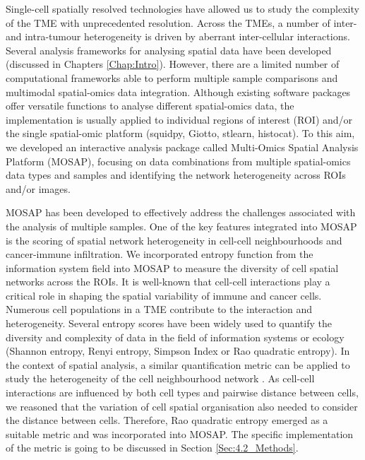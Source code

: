 Single-cell spatially resolved technologies have allowed us to study the complexity of the TME with unprecedented resolution. Across the TMEs, a number of inter- and intra-tumour heterogeneity is driven by aberrant inter-cellular interactions. Several analysis frameworks for analysing spatial data have been developed (discussed in Chapters \ref{Chap:Intro}). However, there are a limited number of computational frameworks able to perform multiple sample comparisons and multimodal spatial-omics data integration. Although existing software packages offer versatile functions to analyse different spatial-omics data, the implementation is usually applied to individual regions of interest (ROI) and/or the single spatial-omic platform (\ie squidpy\cite{palla2022squidpy}, Giotto\cite{dries2021giotto}, stlearn\cite{pham2020stlearn}, histocat\cite{schapiro2017histocat}). To this aim, we developed an interactive analysis package called Multi-Omics Spatial Analysis Platform (MOSAP), focusing on data combinations from multiple spatial-omics data types and samples and identifying the network heterogeneity across ROIs and/or images. 

MOSAP has been developed to effectively address the challenges associated with the analysis of multiple samples. One of the key features integrated into MOSAP is the scoring of spatial network heterogeneity in cell-cell neighbourhoods and cancer-immune infiltration. We incorporated entropy function\cite{botta2005rao} from the information system field into MOSAP to measure the diversity of cell spatial networks across the ROIs. It is well-known that cell-cell interactions play a critical role in shaping the spatial variability of immune and cancer cells. Numerous cell populations in a TME contribute to the interaction and heterogeneity. Several entropy scores have been widely used to quantify the diversity and complexity of data in the field of information systems or ecology (\ie Shannon entropy, Renyi entropy, Simpson Index or Rao quadratic entropy). In the context of spatial analysis, a similar quantification metric can be applied to study the heterogeneity of the cell neighbourhood network \cite{pienta2008ecological, botta2005rao, martinelli2022athena}. As cell-cell interactions are influenced by both cell types and pairwise distance between cells, we reasoned that the variation of cell spatial organisation also needed to consider the distance between cells. Therefore, Rao quadratic entropy emerged as a suitable metric and was incorporated into MOSAP. The specific implementation of the metric is going to be discussed in Section \ref{Sec:4.2_Methods}. 

